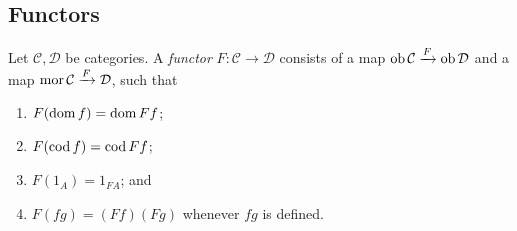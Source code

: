 \subsection{Functors}
\begin{definition}
    Let \( \mathcal C, \mathcal D \) be categories.
    A \emph{functor} \( F : \mathcal C \to \mathcal D \) consists of a map \( \operatorname{ob} \mathcal C \xrightarrow F \operatorname{ob} \mathcal D \) and a map \( \operatorname{mor} \mathcal C \xrightarrow F \mathcal D \), such that
    \begin{enumerate}
        \item \( F(\operatorname{dom} f) = \operatorname{dom} Ff \);
        \item \( F(\operatorname{cod} f) = \operatorname{cod} Ff \);
        \item \( F(1_A) = 1_{F A} \); and
        \item \( F(fg) = (Ff)(Fg) \) whenever \( fg \) is defined.
    \end{enumerate}
\end{definition}

